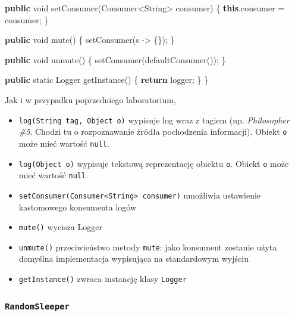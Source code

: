 \documentclass[11pt]{article}
\providecommand{\tightlist}{%
      \setlength{\itemsep}{0pt}\setlength{\parskip}{0pt}}
\newenvironment{Shaded}{}{}
\newcommand{\KeywordTok}[1]{\textcolor[rgb]{0.00,0.44,0.13}{\textbf{{#1}}}}
\newcommand{\DataTypeTok}[1]{\textcolor[rgb]{0.56,0.13,0.00}{{#1}}}
\newcommand{\FunctionTok}[1]{\textcolor[rgb]{0.02,0.16,0.49}{{#1}}}
\newcommand{\NormalTok}[1]{{#1}}
\newcommand{\ControlFlowTok}[1]{\textcolor[rgb]{0.00,0.44,0.13}{\textbf{{#1}}}}
\newcommand{\OperatorTok}[1]{\textcolor[rgb]{0.40,0.40,0.40}{{#1}}}
\newcommand{\BuiltInTok}[1]{{#1}}
\begin{document}
\begin{Shaded}
\begin{Highlighting}[]
    \KeywordTok{public} \DataTypeTok{void} \FunctionTok{setConsumer}\OperatorTok{(}\NormalTok{Consumer}\OperatorTok{\textless{}}\BuiltInTok{String}\OperatorTok{\textgreater{}}\NormalTok{ consumer}\OperatorTok{)} \OperatorTok{\{}
        \KeywordTok{this}\OperatorTok{.}\FunctionTok{consumer} \OperatorTok{=}\NormalTok{ consumer}\OperatorTok{;}
    \OperatorTok{\}}

    \KeywordTok{public} \DataTypeTok{void} \FunctionTok{mute}\OperatorTok{()} \OperatorTok{\{}
        \FunctionTok{setConsumer}\OperatorTok{(}\NormalTok{s }\OperatorTok{{-}\textgreater{}} \OperatorTok{\{\});}
    \OperatorTok{\}}

    \KeywordTok{public} \DataTypeTok{void} \FunctionTok{unmute}\OperatorTok{()} \OperatorTok{\{}
        \FunctionTok{setConsumer}\OperatorTok{(}\FunctionTok{defaultConsumer}\OperatorTok{());}
    \OperatorTok{\}}

    \KeywordTok{public} \DataTypeTok{static} \BuiltInTok{Logger} \FunctionTok{getInstance}\OperatorTok{()} \OperatorTok{\{}
        \ControlFlowTok{return}\NormalTok{ logger}\OperatorTok{;}
    \OperatorTok{\}}
\OperatorTok{\}}
\end{Highlighting}
\end{Shaded}

Jak i w przypadku poprzedniego laboratorium,

\begin{itemize}
\tightlist
\item
  \texttt{log(String\ tag,\ Object\ o)} wypisuje log wraz z tagiem (np.
  \emph{Philosopher \#5}. Chodzi tu o rozpoznawanie źródła pochodzenia
  informacji). Obiekt \texttt{o} może mieć wartość \texttt{null}.
\item
  \texttt{log(Object\ o)} wypisuje tekstową reprezentację obiektu
  \texttt{o}. Obiekt \texttt{o} może mieć wartość \texttt{null}.
\item
  \texttt{setConsumer(Consumer\textless{}String\textgreater{}\ consumer)}
  umożliwia ustawienie kastomowego konsumenta logów
\item
  \texttt{mute()} wycisza Logger
\item
  \texttt{unmute()} przeciwieństwo metody \texttt{mute}: jako konsument
  zostanie użyta domyślna implementacja wypisująca na standardowym
  wyjściu
\item
  \texttt{getInstance()} zwraca instancję klasy \texttt{Logger}
\end{itemize}

    \hypertarget{randomsleeper}{%
\subsubsection{\texorpdfstring{\texttt{RandomSleeper}}{RandomSleeper}}\label{randomsleeper}}
\end{document}
